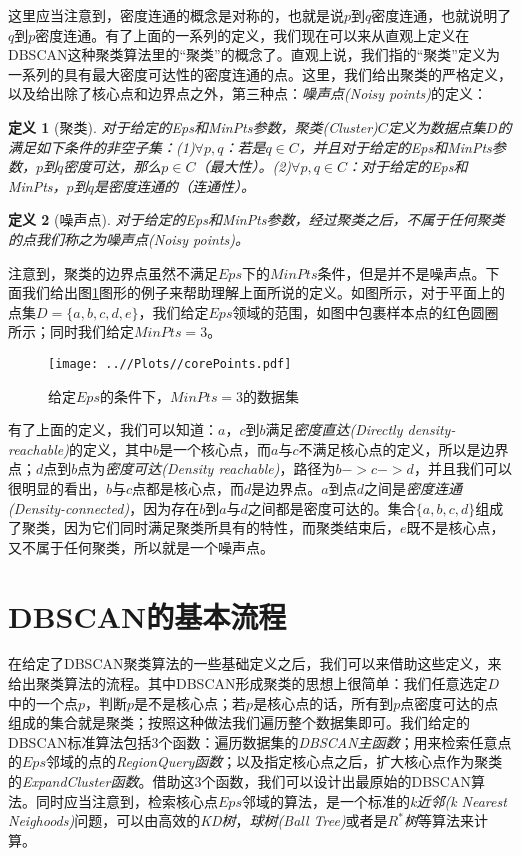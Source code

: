 \documentclass[UTF8, 12pt]{ctexart}
\newtheorem{thm}{定义}
\begin{document}
这里应当注意到，密度连通的概念是对称的，也就是说$p$到$q$密度连通，也就说明了$q$到$p$密度连通。有了上面的一系列的定义，我们现在可以来从直观上定义在DBSCAN这种聚类算法里的“聚类”的概念了。直观上说，我们指的“聚类”定义为一系列的具有最大密度可达性的密度连通的点。这里，我们给出聚类的严格定义，以及给出除了核心点和边界点之外，第三种点：\emph{噪声点(Noisy points)}的定义：
\begin{thm}[聚类]
	对于给定的Eps和MinPts参数，聚类(Cluster)$C$定义为数据点集$D$的满足如下条件的非空子集：(1)$\forall p,q$：若是$q \in C$，并且对于给定的Eps和MinPts参数，$p$到$q$密度可达，那么$p \in C$（最大性）。(2)$\forall p,q \in C$：对于给定的Eps和MinPts，$p$到$q$是密度连通的（连通性）。
\end{thm}
\begin{thm}[噪声点]
	对于给定的Eps和MinPts参数，经过聚类之后，不属于任何聚类的点我们称之为噪声点(Noisy points)。
\end{thm}

注意到，聚类的边界点虽然不满足$Eps$下的$MinPts$条件，但是并不是噪声点。下面我们给出图\ref{Fig:2}图形的例子来帮助理解上面所说的定义。如图所示，对于平面上的点集$D=\{a, b, c, d, e\}$，我们给定$Eps$领域的范围，如图中包裹样本点的红色圆圈所示；同时我们给定$MinPts=3$。
\begin{figure}[H]
	\centering
	\texttt{[image: ..//Plots//corePoints.pdf]}
	\caption{给定$Eps$的条件下，$MinPts=3$的数据集}
	\label{Fig:2}
	\vspace{-0.5em}
\end{figure}

有了上面的定义，我们可以知道：$a$，$c$到$b$满足\emph{密度直达(Directly density-reachable)}的定义，其中$b$是一个核心点，而$a$与$c$不满足核心点的定义，所以是边界点；$d$点到$b$点为\emph{密度可达(Density reachable)}，路径为$b -> c -> d$，并且我们可以很明显的看出，$b$与$c$点都是核心点，而$d$是边界点。$a$到点$d$之间是\emph{密度连通(Density-connected)}，因为存在$b$到$a$与$d$之间都是密度可达的。集合$\{a, b, c, d\}$组成了聚类，因为它们同时满足聚类所具有的特性，而聚类结束后，$e$既不是核心点，又不属于任何聚类，所以就是一个噪声点。

\section{DBSCAN的基本流程}
在给定了DBSCAN聚类算法的一些基础定义之后，我们可以来借助这些定义，来给出聚类算法的流程。其中DBSCAN形成聚类的思想上很简单：我们任意选定$D$中的一个点$p$，判断$p$是不是核心点；若$p$是核心点的话，所有到$p$点密度可达的点组成的集合就是聚类；按照这种做法我们遍历整个数据集即可。我们给定的DBSCAN标准算法包括3个函数：遍历数据集的\emph{DBSCAN主函数}；用来检索任意点的$Eps$邻域的点的\emph{RegionQuery函数}；以及指定核心点之后，扩大核心点作为聚类的\emph{ExpandCluster函数}。借助这3个函数，我们可以设计出最原始的DBSCAN算法。同时应当注意到，检索核心点$Eps$邻域的算法，是一个标准的\emph{k近邻(k Nearest Neighoods)}问题，可以由高效的\emph{KD树}，\emph{球树(Ball Tree)}或者是\emph{$R^{*}$树}等算法来计算。
\end{document}
